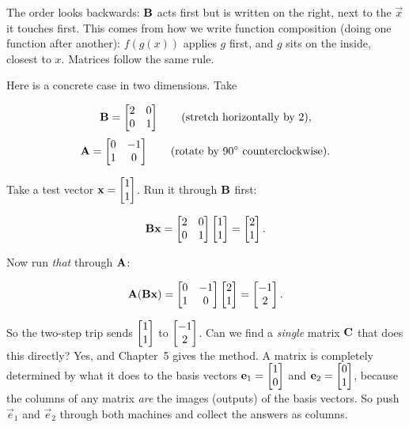 The order looks backwards: $\mathbf{B}$ acts first but is written on the
right, next to the $\vec{x}$ it touches first. This comes from how we write
function composition (doing one function after another): $f(g(x))$ applies $g$ first,
and $g$ sits on the inside, closest to $x$. Matrices follow the same rule.

Here is a concrete case in two dimensions. Take

\[
\mathbf{B} = \begin{bmatrix} 2 & 0 \\ 0 & 1 \end{bmatrix}
\qquad\text{(stretch horizontally by }2\text{)},
\]
\[
\mathbf{A} = \begin{bmatrix} 0 & -1 \\ 1 & 0 \end{bmatrix}
\qquad\text{(rotate by }90^\circ\text{ counterclockwise)}.
\]

Take a test vector $\mathbf{x} = \begin{bmatrix}1 \\ 1\end{bmatrix}$. Run it through $\mathbf{B}$ first:

\[
\mathbf{B}\mathbf{x} = \begin{bmatrix} 2 & 0 \\ 0 & 1 \end{bmatrix}\begin{bmatrix}1 \\ 1\end{bmatrix}
= \begin{bmatrix}2 \\ 1\end{bmatrix}.
\]

Now run \emph{that} through $\mathbf{A}$:

\[
\mathbf{A}(\mathbf{B}\mathbf{x}) = \begin{bmatrix} 0 & -1 \\ 1 & 0 \end{bmatrix}\begin{bmatrix}2 \\ 1\end{bmatrix}
= \begin{bmatrix}-1 \\ 2\end{bmatrix}.
\]

So the two-step trip sends $\begin{bmatrix}1 \\ 1\end{bmatrix}$ to $\begin{bmatrix}-1 \\ 2\end{bmatrix}$. Can we find a
\emph{single} matrix $\mathbf{C}$ that does this directly? Yes, and Chapter~5 gives the
method. A matrix is completely determined by what it does to the
basis vectors $\mathbf{e}_1 = \begin{bmatrix}1 \\ 0\end{bmatrix}$ and $\mathbf{e}_2 = \begin{bmatrix}0 \\ 1\end{bmatrix}$, because
the columns of any matrix \emph{are} the images (outputs) of the basis vectors. So push
$\vec{e}_1$ and $\vec{e}_2$ through both machines and collect the answers as
columns.

